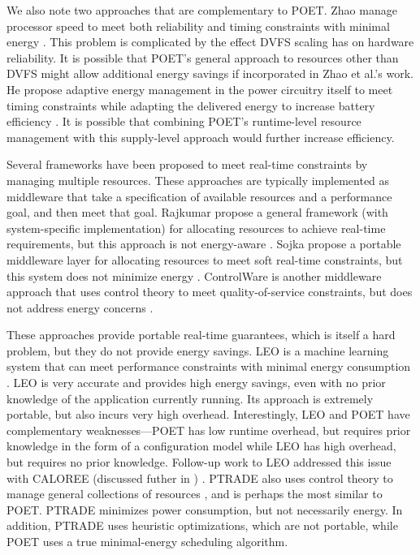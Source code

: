 We also note two approaches that are complementary to POET.
Zhao \etal manage processor speed to meet both reliability and timing constraints with minimal energy \cite{Zhao2012}.
This problem is complicated by the effect DVFS scaling has on hardware reliability.
It is possible that POET's general approach to resources other than DVFS might allow additional energy savings if incorporated in Zhao et al.'s work.
He \etal propose adaptive energy management in the power circuitry itself to meet timing constraints while adapting the delivered energy to increase battery efficiency \cite{He2013}.
It is possible that combining POET's runtime-level resource management with this supply-level approach would further increase efficiency.

Several frameworks have been proposed to meet real-time constraints by managing multiple resources.
These approaches are typically implemented as middleware that take a specification of available resources and a performance goal, and then meet that goal.
Rajkumar \etal propose a general framework (with system-specific implementation) for allocating resources to achieve real-time requirements, but this approach is not energy-aware \cite{Rajkumar}.
Sojka \etal propose a portable middleware layer for allocating resources to meet soft real-time constraints, but this system does not minimize energy \cite{Sojka}.
ControlWare is another middleware approach that uses control theory to meet quality-of-service constraints, but does not address energy concerns \cite{ControlWare}.

These approaches provide portable real-time guarantees, which is itself a hard problem, but they do not provide energy savings.
LEO is a machine learning system that can meet performance constraints with minimal energy consumption \cite{LEO}.
LEO is very accurate and provides high energy savings, even with no prior knowledge of the application currently running.
Its approach is extremely portable, but also incurs very high overhead.
Interestingly, LEO and POET have complementary weaknesses---POET has low runtime overhead, but requires prior knowledge in the form of a configuration model while LEO has high overhead, but requires no prior knowledge.
Follow-up work to LEO addressed this issue with CALOREE (discussed futher in ) \cite{CALOREE}.
PTRADE also uses control theory to manage general collections of resources \cite{PTRADE}, and is perhaps the most similar to POET.
PTRADE minimizes power consumption, but not necessarily energy.
In addition, PTRADE uses heuristic optimizations, which are not portable, while POET uses a true minimal-energy scheduling algorithm.


